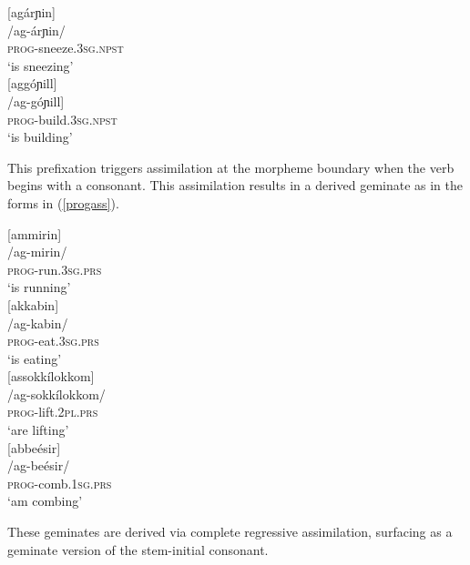 \documentclass[output=paper]{langscibook}
\begin{document}
\begin{multicols}{2}

\begin{xlist}
\ex {}[agárɲin]\\
/ag-árɲin/\\
\textsc{prog}-sneeze.\textsc{3sg.npst}\\
`is sneezing'\\

\ex {}[agg\'oɲill]\\
/ag-g\'oɲill]\\
\textsc{prog}-build.\textsc{3sg.npst}\\
`is building'\\

\end{xlist}

\end{multicols}

\z

This prefixation triggers assimilation at the morpheme boundary when the verb begins with a consonant. This assimilation results in a derived geminate as in the forms in (\ref{progass}).\largerpage[2]

\ea \label{progass}
\begin{multicols}{2}\raggedcolumns
\ea
{}[ammirin]\\
/ag-mirin/\\
\textsc{prog}-run.\textsc{3sg.prs}\\
`is running'\\\columnbreak
\ex {}[akkabin]\\
/ag-kabin/\\
\textsc{prog}-eat.\textsc{3sg.prs}\\
`is eating'\\\columnbreak
%
\ex {}[assokk\'ilokkom]\\
/ag-sokk\'ilokkom/\\
\textsc{prog}-lift.\textsc{2pl.prs}\\
`are lifting'\\\columnbreak
\ex {}[abbe\'esir]\\
/ag-be\'esir/\\
\textsc{prog}-comb.\textsc{1sg.prs}\\
`am combing'\\
\z
\end{multicols}
\z

These geminates are derived via complete regressive assimilation, surfacing as a geminate version of the stem-initial consonant.
\end{document}
